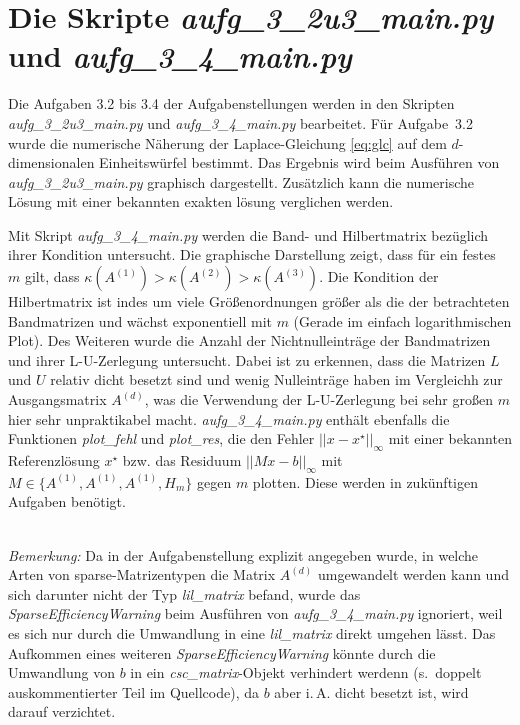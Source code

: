 \documentclass[letterpaper,10pt,ngerman, oneside, openright]{sphinxmanual}
\begin{document}
\chapter{Die Skripte \textit{aufg\_3\_2u3\_main.py} und \textit{aufg\_3\_4\_main.py}}

Die Aufgaben 3.2 bis 3.4 der Aufgabenstellungen werden in den Skripten \textit{aufg\_3\_2u3\_main.py} und \textit{aufg\_3\_4\_main.py} bearbeitet. Für Aufgabe~3.2 wurde die numerische Näherung der Laplace-Gleichung \eqref{eq:glc} auf dem $d$-dimensionalen Einheitswürfel bestimmt. Das Ergebnis wird beim Ausführen von \textit{aufg\_3\_2u3\_main.py} graphisch dargestellt. Zusätzlich kann die numerische Lösung mit einer bekannten exakten lösung verglichen werden.

Mit Skript \textit{aufg\_3\_4\_main.py} werden die Band- und Hilbertmatrix bezüglich ihrer Kondition untersucht. Die graphische Darstellung zeigt, dass für ein festes $m$ gilt, dass $\kappa(A^{(1)})>\kappa(A^{(2)})>\kappa(A^{(3)})$. Die Kondition der Hilbertmatrix ist indes um viele Größenordnungen größer als die der betrachteten Bandmatrizen und wächst exponentiell mit $m$ (Gerade im einfach logarithmischen Plot). Des Weiteren wurde die Anzahl der Nichtnulleinträge der Bandmatrizen und ihrer L-U-Zerlegung untersucht. Dabei ist zu erkennen, dass die Matrizen $L$ und $U$ relativ dicht besetzt sind und wenig Nulleinträge haben im Vergleichh zur Ausgangsmatrix $A^{(d)}$, was die Verwendung der L-U-Zerlegung bei sehr großen $m$ hier sehr unpraktikabel macht. \textit{aufg\_3\_4\_main.py}  enthält ebenfalls die Funktionen \textit{plot\_fehl} und \textit{plot\_res}, die den Fehler $|\lvert x-x^\star|\rvert_\infty$ mit einer bekannten Referenzlösung $x^\star$ bzw. das Residuum $|\lvert Mx-b|\rvert_\infty$ mit $M\in \{A^{(1)},A^{(1)},A^{(1)}, H_m\}$ gegen $m$ plotten. Diese werden in zukünftigen Aufgaben benötigt.

~\\
\emph{Bemerkung:} Da in der Aufgabenstellung explizit angegeben wurde, in welche Arten von sparse-Matrizentypen die Matrix $A^{(d)}$ umgewandelt werden kann und sich darunter nicht der Typ \textit{lil\_matrix} befand, wurde das \textit{SparseEfficiencyWarning} beim Ausführen von \textit{aufg\_3\_4\_main.py} ignoriert, weil es sich nur durch die Umwandlung in eine \textit{lil\_matrix} direkt umgehen lässt. Das Aufkommen eines weiteren \textit{SparseEfficiencyWarning} könnte durch die Umwandlung von $b$ in ein \textit{csc\_matrix}-Objekt verhindert werdenn (s.~doppelt auskommentierter Teil im Quellcode), da $b$ aber i.\,A. dicht besetzt ist, wird darauf verzichtet.



\end{document}
